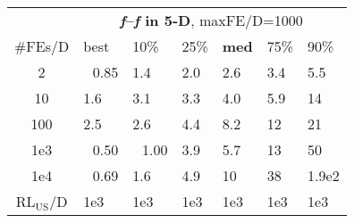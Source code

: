 \begin{tabular}{c|llllll}
 & \multicolumn{6}{|c}{\textbf{\textit{f}\raisebox{-0.35ex}{1}--\textit{f}\raisebox{-0.35ex}{24} in 5-D}, maxFE/D=1000}\\
\#FEs/D & best & 10\% & 25\% & \textbf{med} & 75\% & 90\%\\
2 & ~\,0.85 & \hspace*{1ex}1.4 & \hspace*{1ex}2.0 & \hspace*{1ex}2.6 & \hspace*{1ex}3.4 & \hspace*{1ex}5.5\\
10 & \hspace*{1ex}1.6 & \hspace*{1ex}3.1 & \hspace*{1ex}3.3 & \hspace*{1ex}4.0 & \hspace*{1ex}5.9 & 14\\
100 & \hspace*{1ex}2.5 & \hspace*{1ex}2.6 & \hspace*{1ex}4.4 & \hspace*{1ex}8.2 & 12 & 21\\
1e3 & ~\,0.50 & ~\,1.00 & \hspace*{1ex}3.9 & \hspace*{1ex}5.7 & 13 & 50\\
1e4 & ~\,0.69 & \hspace*{1ex}1.6 & \hspace*{1ex}4.9 & 10 & 38 & 1.9e2\\
$\text{RL}_{\text{US}}$/D & 1e3 & 1e3 & 1e3 & 1e3 & 1e3 & 1e3
\end{tabular}
